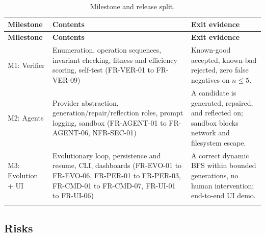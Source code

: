 \documentclass[12pt,a4paper]{article}
\begin{document}
\begin{center}
\footnotesize
\setlength{\tabcolsep}{4pt}
\begin{longtable}{@{}p{3.0cm}p{5.6cm}p{4.2cm}@{}}
\toprule
\textbf{Milestone} & \textbf{Contents} & \textbf{Exit evidence} \\
\midrule
\endfirsthead
\toprule
\textbf{Milestone} & \textbf{Contents} & \textbf{Exit evidence} \\
\midrule
\endhead
\bottomrule
\endfoot

M1: Verifier & Enumeration, operation sequences, invariant checking, fitness and efficiency scoring, self-test (FR-VER-01 to FR-VER-09) & Known-good accepted, known-bad rejected, zero false negatives on $n \le 5$. \\
\addlinespace[2pt]
M2: Agents & Provider abstraction, generation/repair/reflection roles, prompt logging, sandbox (FR-AGENT-01 to FR-AGENT-06, NFR-SEC-01) & A candidate is generated, repaired, and reflected on; sandbox blocks network and filesystem escape. \\
\addlinespace[2pt]
M3: Evolution + UI & Evolutionary loop, persistence and resume, CLI, dashboards (FR-EVO-01 to FR-EVO-06, FR-PER-01 to FR-PER-03, FR-CMD-01 to FR-CMD-07, FR-UI-01 to FR-UI-06) & A correct dynamic BFS within bounded generations, no human intervention; end-to-end UI demo. \\
\bottomrule
\caption{Milestone and release split.}
\label{tab:milestones}
\end{longtable}
\end{center}

\subsection{Risks}
\end{document}
